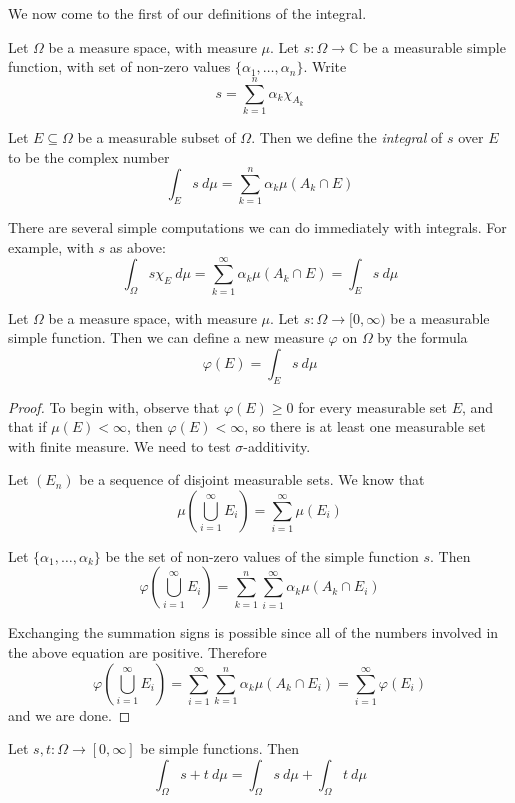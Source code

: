 We now come to the first of our definitions of the integral.

\begin{definition}
Let $\Omega$ be a measure space, with measure $\mu$.  Let $s\colon \Omega \rightarrow {\mathbb C}$ be a measurable simple function, with set of non-zero values $\{ \alpha_1 ,\ldots , \alpha_n \}$.  Write
$$s = \sum_{k=1}^n \alpha_k \chi_{A_k}$$

Let $E\subseteq \Omega$ be a measurable subset of $\Omega$.  Then we define the {\em integral} of $s$ over $E$ to be the complex number
$$\int_E s\ d\mu = \sum_{k=1}^n \alpha_k \mu (A_k \cap E )$$
\end{definition}

There are several simple computations we can do immediately with integrals.  For example, with $s$ as above:
$$\int_\Omega s\chi_E \ d\mu = \sum_{k=1}^\infty \alpha_k \mu (A_k \cap E) = \int_E s\ d\mu$$

\begin{lemma} \label{stepmeasure}
Let $\Omega$ be a measure space, with measure $\mu$.  Let $s\colon \Omega \rightarrow [0,\infty )$ be a measurable simple function.  Then we can define a new measure $\varphi$ on $\Omega$ by the formula
$$\varphi (E) = \int_E s\ d\mu$$
\end{lemma}

\begin{proof}
To begin with, observe that $\varphi (E)\geq 0$ for every measurable set $E$, and that if $\mu (E)<\infty$, then $\varphi (E)<\infty$, so there is at least one measurable set with finite measure.  We need to test $\sigma$-additivity.

Let $(E_n)$ be a sequence of disjoint measurable sets.  We know that
$$\mu (\bigcup_{i=1}^\infty E_i ) = \sum_{i=1}^\infty \mu (E_i)$$

Let $\{ \alpha_1 , \ldots , \alpha_k \}$ be the set of non-zero values of the simple function $s$.  Then
$$\varphi (\bigcup_{i=1}^\infty E_i ) = \sum_{k=1}^n \sum_{i=1}^\infty \alpha_k \mu (A_k \cap E_i )$$

Exchanging the summation signs is possible since all of the numbers involved in the above equation are positive.  Therefore
$$\varphi (\bigcup_{i=1}^\infty E_i ) = \sum_{i=1}^\infty \sum_{k=1}^n \alpha_k \mu (A_k \cap E_i ) = \sum_{i=1}^\infty \varphi (E_i)$$
and we are done.
\end{proof}

\begin{proposition} \label{simpsum}
Let $s,t\colon \Omega \rightarrow [0,\infty ]$ be simple functions.  Then
$$\int_\Omega s+t\ d\mu = \int_\Omega s\ d\mu + \int_\Omega t\ d\mu$$
\end{proposition}

